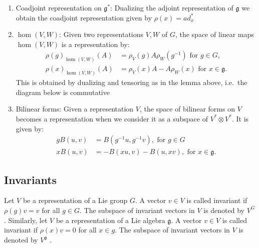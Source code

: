 \documentclass{report}
\begin{document}
\begin{example}
    \begin{enumerate}[label = (\roman*)]
        \item Coadjoint representation on $\mathfrak g^*$: Dualizing the adjoint representation of $\mathfrak g$ we obtain the coadjoint representation given by $\rho(x) = ad_x^*$
        \item $\hom(V,W)$: Given two representations $V, W$ of $G$, the space of linear maps $\hom(V,W)$ is a representation by:
        \begin{align*}
            \rho(g)_{\hom(V,W)}(A) &= \rho_V(g)A\rho_W(g^{-1}) \text{ for } g \in G,\\
            \rho(x)_{\hom(V,W)}(A) &= \rho_V(x)A - A\rho_W(x) \text{ for } x \in \mathfrak g.
        \end{align*}
        This is obtained by dualizing and tensoring as in the lemma above, i.e.\ the diagram below is commutative\\
        \begin{center}
        \end{center}
        \item Bilinear forms: Given a representation $V$, the space of bilinear forms on $V$ becomes a representation when we consider it as a subspace of $V^* \otimes V^*$. It is given by:
        \begin{align*}
            g B(u, v) &= B(g^{-1}u, g^{-1}v), \text{ for } g \in G\\
            x B(u, v) &= -B(x u, v) - B(u, x v), \text{ for } x \in \mathfrak g.    
        \end{align*}
    \end{enumerate}
\end{example}

\subsection{Invariants}
\begin{definition}
    Let $V$ be a representation of a Lie group $G$. A vector $v \in V$ is
    called invariant if $\rho(g)v = v$ for all $g \in G$. The subspace of invariant vectors
    in $V$ is denoted by $V^G$ .
    Similarly, let $V$ be a representation of a Lie algebra $\mathfrak g$. A vector $v \in V$ is
    called invariant if $\rho(x)v = 0$ for all $x \in g$. The subspace of invariant vectors
    in $V$ is denoted by $V^{\mathfrak g}$ .
\end{definition}
\end{document}
